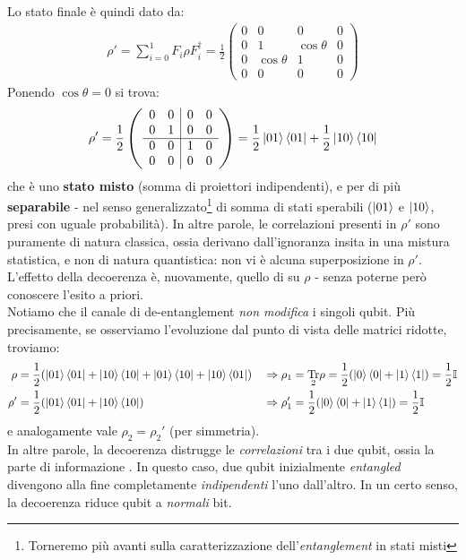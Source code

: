 \documentclass[../../InformazioneQuantistica.tex]{subfiles}
\begin{document}
Lo stato finale è quindi dato da:
\begin{align*}
\rho' = \sum_{i=0}^1 F_i \rho F_i^\dag = \frac{1}{2}\left(
\begin{array}{cc|cc}
0 & 0 & 0 & 0\\ 
0 & 1 & \cos\theta & 0\\ \hline
0 & \cos\theta & 1 & 0\\
0 & 0 & 0 & 0
\end{array}
\right)
\end{align*}
Ponendo $\cos\theta = 0$ si trova:
\begin{align*}
\rho' = \frac{1}{2}\left(
\begin{array}{cc|cc}
0 & 0 & 0 & 0\\ 
0 & 1 & 0 & 0\\ \hline
0 & 0 & 1 & 0\\
0 & 0 & 0 & 0
\end{array}
\right) = \frac{1}{2}\Ket{01}\Bra{01} + \frac{1}{2}\Ket{10}\Bra{10}
\end{align*}
che è uno \textbf{stato misto} (somma di proiettori indipendenti), e per di più \textbf{separabile} - nel senso generalizzato\footnote{Torneremo più avanti sulla caratterizzazione dell'\textit{entanglement} in stati misti} di somma di stati sperabili ($\Ket{01}$ e $\Ket{10}$, presi con uguale probabilità). In altre parole, le correlazioni presenti in $\rho'$ sono puramente di natura classica, ossia derivano dall'ignoranza insita in una mistura statistica, e non di natura quantistica: non vi è alcuna superposizione in $\rho'$.\\
L'effetto della decoerenza è, nuovamente, quello di  su $\rho$ - senza poterne però conoscere l'esito a priori.\\

Notiamo che il canale di de-entanglement \textit{non modifica} i singoli qubit. Più precisamente, se osserviamo l'evoluzione dal punto di vista delle matrici ridotte, troviamo:
\begin{align*}
    \rho &= \frac{1}{2}(\Ket{01}\Bra{01} + \Ket{10}\Bra{10} + \Ket{01}\Bra{10} + \Ket{10}\Bra{01}) && \Rightarrow \rho_1 = \underset{2}{\operatorname{Tr}}\rho = \frac{1}{2}(\Ket{0}\Bra{0} + \Ket{1}\Bra{1}) = \frac{1}{2}\mathbb{I}\\
    \rho' &= \frac{1}{2}(\Ket{01}\Bra{01} + \Ket{10}\Bra{10}) &&\Rightarrow \rho_1' = \frac{1}{2}(\Ket{0}\Bra{0} + \Ket{1}\Bra{1}) = \frac{1}{2}\mathbb{I}
\end{align*}
e analogamente vale $\rho_2 = \rho_2'$ (per simmetria).\\
In altre parole, la decoerenza distrugge le \textit{correlazioni} tra i due qubit, ossia la parte di informazione . In questo caso, due qubit inizialmente \textit{entangled} divengono alla fine completamente \textit{indipendenti} l'uno dall'altro. In un certo senso, la decoerenza riduce qubit a \textit{normali} bit.
\end{document}
